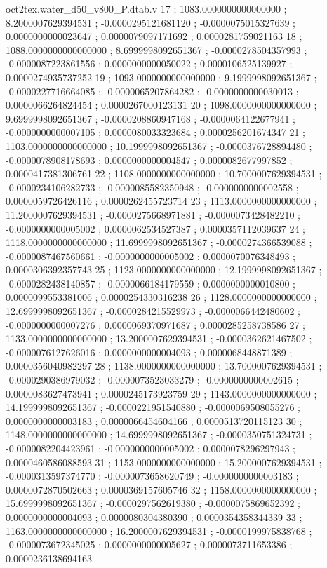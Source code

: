 \begin{filecontents}[overwrite]{oct2tex.water_d50_v800_P.dtab.v}
17 ; 1083.0000000000000000 ; 8.2000007629394531 ; -0.0000295121681120 ; -0.0000075015327639 ; 0.0000000000023647 ; 0.0000079097171692 ; 0.0000281759021163
18 ; 1088.0000000000000000 ; 8.6999998092651367 ; -0.0000278504357993 ; -0.0000087223861556 ; 0.0000000000050022 ; 0.0000106525139927 ; 0.0000274935737252
19 ; 1093.0000000000000000 ; 9.1999998092651367 ; -0.0000227716664085 ; -0.0000065207864282 ; -0.0000000000030013 ; 0.0000066264824454 ; 0.0000267000123131
20 ; 1098.0000000000000000 ; 9.6999998092651367 ; -0.0000208860947168 ; -0.0000064122677941 ; -0.0000000000007105 ; 0.0000080033323684 ; 0.0000256201674347
21 ; 1103.0000000000000000 ; 10.1999998092651367 ; -0.0000376728894480 ; -0.0000078908178693 ; 0.0000000000004547 ; 0.0000082677997852 ; 0.0000417381306761
22 ; 1108.0000000000000000 ; 10.7000007629394531 ; -0.0000234106282733 ; -0.0000085582350948 ; -0.0000000000002558 ; 0.0000059726426116 ; 0.0000262455723714
23 ; 1113.0000000000000000 ; 11.2000007629394531 ; -0.0000275668971881 ; -0.0000073428482210 ; -0.0000000000005002 ; 0.0000062534527387 ; 0.0000357112039637
24 ; 1118.0000000000000000 ; 11.6999998092651367 ; -0.0000274366539088 ; -0.0000087467560661 ; -0.0000000000005002 ; 0.0000070076348493 ; 0.0000306392357743
25 ; 1123.0000000000000000 ; 12.1999998092651367 ; -0.0000282438140857 ; -0.0000066184179559 ; 0.0000000000010800 ; 0.0000099553381006 ; 0.0000254330316238
26 ; 1128.0000000000000000 ; 12.6999998092651367 ; -0.0000284215529973 ; -0.0000066442480602 ; -0.0000000000007276 ; 0.0000069370971687 ; 0.0000285258738586
27 ; 1133.0000000000000000 ; 13.2000007629394531 ; -0.0000362621467502 ; -0.0000076127626016 ; 0.0000000000004093 ; 0.0000068448871389 ; 0.0000356040982297
28 ; 1138.0000000000000000 ; 13.7000007629394531 ; -0.0000290386979032 ; -0.0000073523033279 ; -0.0000000000002615 ; 0.0000083627473941 ; 0.0000245173923759
29 ; 1143.0000000000000000 ; 14.1999998092651367 ; -0.0000221951540880 ; -0.0000069508055276 ; 0.0000000000003183 ; 0.0000066454604166 ; 0.0000513720115123
30 ; 1148.0000000000000000 ; 14.6999998092651367 ; -0.0000350751324731 ; -0.0000082204423961 ; -0.0000000000005002 ; 0.0000078296297943 ; 0.0000460586088593
31 ; 1153.0000000000000000 ; 15.2000007629394531 ; -0.0000313597374770 ; -0.0000073658620749 ; -0.0000000000003183 ; 0.0000072870502663 ; 0.0000369157605746
32 ; 1158.0000000000000000 ; 15.6999998092651367 ; -0.0000297562619380 ; -0.0000075869652392 ; 0.0000000000004093 ; 0.0000080304380390 ; 0.0000354358344339
33 ; 1163.0000000000000000 ; 16.2000007629394531 ; -0.0000199975838768 ; -0.0000073672345025 ; 0.0000000000005627 ; 0.0000073711653386 ; 0.0000236138694163

\end{filecontents}
